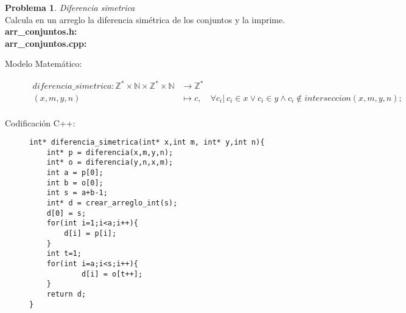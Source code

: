 \documentclass{article}
\theoremstyle{plain}
\theoremstyle{definition}
\newtheorem{problem}{Problema}
\begin{document}
\begin{problem} \emph{Diferencia simetrica}\\
Calcula en un arreglo la diferencia simétrica de los conjuntos y la imprime.\\
\textbf{arr\_conjuntos.h:}\ \\
\textbf{arr\_conjuntos.cpp:}\ 
%
\begin{description}
\item[Modelo Matemático:]
%
\begin{align*}
diferencia\_simetrica: \mathbb{Z}^*\times\mathbb{N}\times\mathbb{Z}^*\times\mathbb{N} &\to \mathbb{Z}^*\\
(x,m,y,n) &\mapsto c,& \forall c_i |\ c_i \in x \vee c_i \in y \wedge c_i \not\in interseccion(x,m,y,n);  \\
\end{align*}
%
\item[Codificación \textsf{C++}:]\hfill
%
\begin{verbatim}
int* diferencia_simetrica(int* x,int m, int* y,int n){
    int* p = diferencia(x,m,y,n);
    int* o = diferencia(y,n,x,m);
    int a = p[0];
    int b = o[0];
    int s = a+b-1;
    int* d = crear_arreglo_int(s);
    d[0] = s;
    for(int i=1;i<a;i++){
        d[i] = p[i];
    }
    int t=1;
    for(int i=a;i<s;i++){
            d[i] = o[t++];
    }
    return d;
}
\end{verbatim}
\end{description}
\end{problem}
\end{document}

